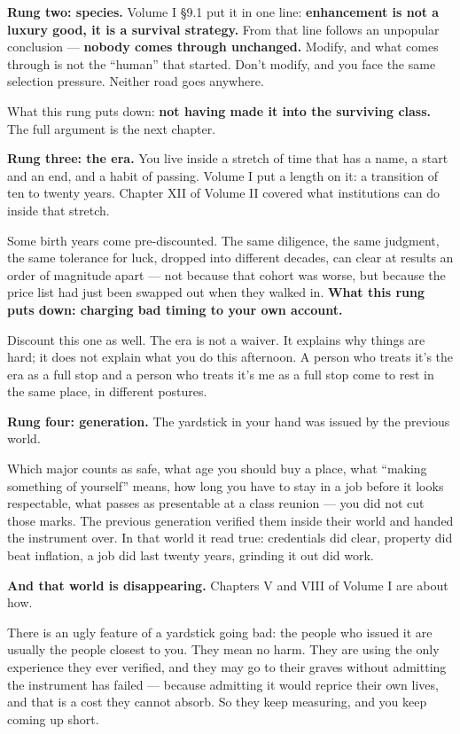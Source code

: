 \documentclass[11pt,a4paper]{article}
\begin{document}
\textbf{Rung two: species.} Volume I \S{}9.1 put it in one line: \textbf{enhancement is not a luxury good, it is a survival strategy.} From that line follows an unpopular conclusion --- \textbf{nobody comes through unchanged.} Modify, and what comes through is not the ``human'' that started. Don't modify, and you face the same selection pressure. Neither road goes anywhere.

What this rung puts down: \textbf{not having made it into the surviving class.} The full argument is the next chapter.

\textbf{Rung three: the era.} You live inside a stretch of time that has a name, a start and an end, and a habit of passing. Volume I put a length on it: a transition of ten to twenty years. Chapter XII of Volume II covered what institutions can do inside that stretch.

Some birth years come pre-discounted. The same diligence, the same judgment, the same tolerance for luck, dropped into different decades, can clear at results an order of magnitude apart --- not because that cohort was worse, but because the price list had just been swapped out when they walked in. \textbf{What this rung puts down: charging bad timing to your own account.}

Discount this one as well. The era is not a waiver. It explains why things are hard; it does not explain what you do this afternoon. A person who treats it's the era as a full stop and a person who treats it's me as a full stop come to rest in the same place, in different postures.

\textbf{Rung four: generation.} The yardstick in your hand was issued by the previous world.

Which major counts as safe, what age you should buy a place, what ``making something of yourself'' means, how long you have to stay in a job before it looks respectable, what passes as presentable at a class reunion --- you did not cut those marks. The previous generation verified them inside their world and handed the instrument over. In that world it read true: credentials did clear, property did beat inflation, a job did last twenty years, grinding it out did work.

\textbf{And that world is disappearing.} Chapters V and VIII of Volume I are about how.

There is an ugly feature of a yardstick going bad: the people who issued it are usually the people closest to you. They mean no harm. They are using the only experience they ever verified, and they may go to their graves without admitting the instrument has failed --- because admitting it would reprice their own lives, and that is a cost they cannot absorb. So they keep measuring, and you keep coming up short.
\end{document}
